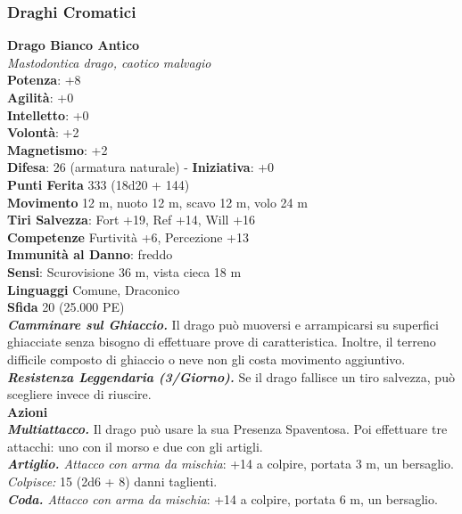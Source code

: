 \begin{multicols}{2}
\subsubsection{Draghi Cromatici}

\medskip\textbf{Drago Bianco Antico}\\
\emph{Mastodontica drago, caotico malvagio}\\
\textbf{Potenza}: +8\\
\textbf{Agilità}: +0\\
\textbf{Intelletto}: +0\\
\textbf{Volontà}: +2\\
\textbf{Magnetismo}: +2\\
\textbf{Difesa}: 26 (armatura naturale) - \textbf{Iniziativa}: +0\\
\textbf{Punti Ferita} 333 (18d20 + 144)\\
\textbf{Movimento} 12 m, nuoto 12 m, scavo 12 m, volo 24 m\\
\textbf{Tiri Salvezza}: Fort +19, Ref +14, Will +16\\
\textbf{Competenze} Furtività +6, Percezione +13\\
\textbf{Immunità al Danno}: freddo\\
\textbf{Sensi}: Scurovisione 36 m, vista cieca 18 m\\
\textbf{Linguaggi} Comune, Draconico\\
\textbf{Sfida} 20 (25.000 PE)\smallskip\\
\emph{\textbf{Camminare sul Ghiaccio.}} Il drago può muoversi e arrampicarsi su superfici ghiacciate senza bisogno di effettuare prove di caratteristica. Inoltre, il terreno difficile composto di ghiaccio o neve non gli costa movimento aggiuntivo.\\
\emph{\textbf{Resistenza Leggendaria (3/Giorno).}} Se il drago fallisce un tiro salvezza, può scegliere invece di riuscire.\\
\smallskip\textbf{Azioni}\\
\emph{\textbf{Multiattacco.}} Il drago può usare la sua Presenza Spaventosa. Poi effettuare tre attacchi: uno con il morso e due con gli artigli.\\
\emph{\textbf{Artiglio.} Attacco con arma da mischia}: +14 a colpire, portata 3 m, un bersaglio.\\
\emph{Colpisce:} 15 (2d6 + 8) danni taglienti.\\
\emph{\textbf{Coda.} Attacco con arma da mischia}: +14 a colpire, portata 6 m, un bersaglio.\\

\end{multicols}
